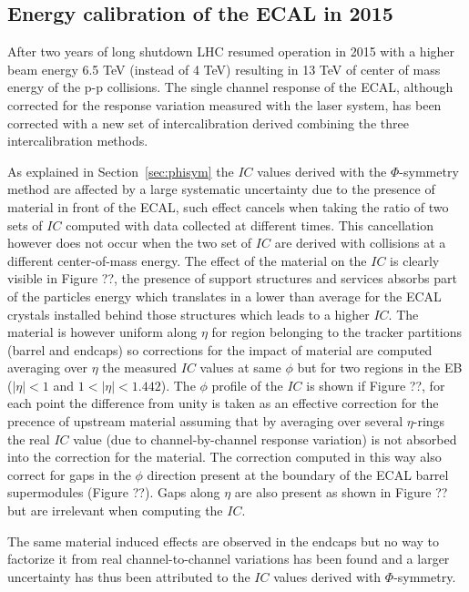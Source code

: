 \subsection{Energy calibration of the ECAL in 2015}
\label{sec:calib_2015}

After two years of long shutdown LHC resumed operation in 2015 with a higher beam energy 6.5 TeV (instead of 4 TeV) resulting
in 13 TeV of center of mass energy of the p-p collisions. The single channel response of the ECAL, although corrected
for the response variation measured with the laser system, has been corrected with a new set of intercalibration
derived combining the three intercalibration methods.

As explained in Section~\ref{sec:phisym} the $IC$ values derived with the $\Phi$-symmetry method are affected by
a large systematic uncertainty due to the presence of material in front of the ECAL, such effect cancels when taking
the ratio of two sets of $IC$ computed with data collected at different times. This cancellation however does not occur
when the two set of $IC$ are derived with collisions at a different center-of-mass energy.
The effect of the material on the $IC$ is clearly visible in Figure ??, the presence of support structures and services
absorbs part of the particles energy which translates in a lower than average \sumEt for the ECAL crystals installed
behind those structures which leads to a higher $IC$. The material is however uniform along $\eta$ for region belonging
to the tracker partitions (barrel and endcaps) so corrections for the impact of material are computed averaging
over $\eta$ the measured $IC$ values at same $\phi$ but for two regions in the EB ($|\eta|<1$ and $1<|\eta|<1.442$).
The $\phi$ profile of the $IC$ is shown if Figure ??, for each point the difference from unity is taken as an effective
correction for the precence of upstream material assuming that by averaging over several $\eta$-rings the real
$IC$ value (due to channel-by-channel response variation) is not absorbed into the correction for the material.
The correction computed in this way also correct for gaps in the $\phi$ direction present at the boundary of the ECAL barrel
supermodules (Figure ??). Gaps along $\eta$ are also present as shown in Figure ?? but are irrelevant when computing
the $IC$.

The same material induced effects are observed in the endcaps but no way to factorize it from real channel-to-channel
variations has been found and a larger uncertainty has thus been attributed to the $IC$ values derived with $\Phi$-symmetry.

